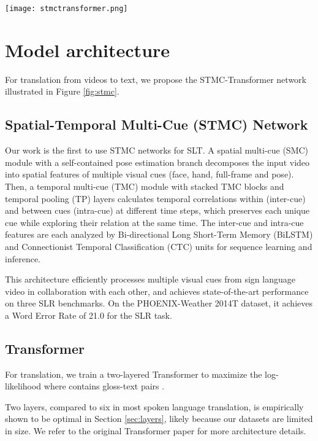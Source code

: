 \documentclass[11pt]{article}
\begin{document}
\begin{figure*}
\center
    \texttt{[image: stmctransformer.png]}
    \caption{STMC-Transformer network for SLT. PE: Positional Encoding, MHA: Multihead Attention, FF: Feed Forward.}
    \label{fig:stmc}
\end{figure*} 

\section{Model architecture}

For translation from videos to text, we propose the STMC-Transformer network illustrated in Figure \ref{fig:stmc}.

\subsection{Spatial-Temporal Multi-Cue (STMC) Network}
Our work is the first to use STMC networks \cite{stmc} for SLT. A spatial multi-cue (SMC) module with a self-contained pose estimation branch decomposes the input video into spatial features of multiple visual cues (face, hand, full-frame and pose). Then, a temporal multi-cue (TMC) module with stacked TMC blocks and temporal pooling (TP) layers calculates temporal correlations within (inter-cue) and between cues (intra-cue) at different time steps, which preserves each unique cue while exploring their relation at the same time. The inter-cue and intra-cue features are each analyzed by Bi-directional Long Short-Term Memory (BiLSTM) \cite{rnn2} and Connectionist Temporal Classification (CTC) \cite{ctc} units for sequence learning and inference. 

This architecture efficiently processes multiple visual cues from sign language video in collaboration with each other, and achieves state-of-the-art performance on three SLR benchmarks. On the PHOENIX-Weather 2014T dataset, it achieves a Word Error Rate of 21.0 for the SLR task. 

\subsection{Transformer}

For translation, we train a two-layered Transformer to maximize the log-likelihood 
where  contains gloss-text pairs . 

Two layers, compared to six in most spoken language translation, is empirically shown to be optimal in Section \ref{sec:layers}, likely because our datasets are limited in size. We refer to the original Transformer paper \cite{transformer} for more architecture details.
\end{document}
